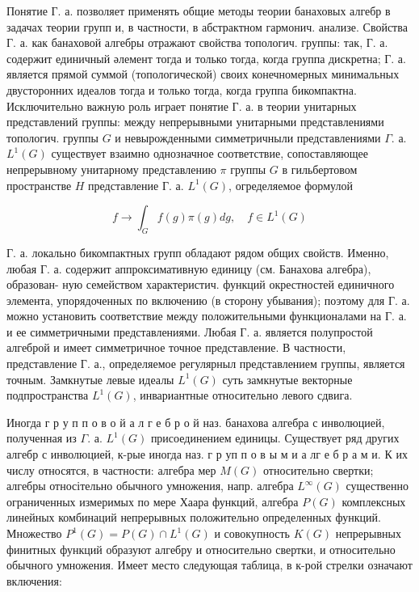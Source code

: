 \documentclass[10pt]{article}
\begin{document}
Понятие Г. а. позволяет применять общие методы теории банаховых алгебр в задачах теории групп и, в частности, в абстрактном гармонич. анализе. Свойства Г. а. как банаховой алгебры отражают свойства топологич. группы: так, Г. а. содержит единичный әлемент тогда и только тогда, когда группа дискретна; Г. а. является прямой суммой (топологической) своих конечномерных минимальных двусторонних идеалов тогда и только тогда, когда группа бикомпактна. Исключительно важную роль играет понятие Г. а. в теории унитарных представлений группы: между непрерывными унитарными представлениями топологич. группы $G$ и невырожденными симметричныли представлениями $\Gamma$. а. $L^{1}(G)$ существует взаимно однозначное соответствие, сопоставляющее непрерывному унитарному представлению $\pi$ группы $G$ в гильбертовом пространстве $H$ представление Г. а. $L^{1}(G)$, огределяемое формулой



\[

f \longrightarrow \int_{G} f(g) \pi(g) d g, \quad f \in L^{1}(G)

\]



Г. а. локально бикомпактных групп обладают рядом общих свойств. Именно, любая Г. а. содержит аппроксимативную единицу (см. Банахова алгебра), образован- ную семейством характеристич. функций окрестностей единичного элемента, упорядоченных по включению (в сторону убывания); поэтому для Г. а. можно установить соответствие между положительными функционалами на $Г$. а. и ее симметричными представлениями. Любая Г. а. является полупростой алгеброй и имеет симметричное точное представление. В частности, представление Г. а., определяемое регулярныл представлением группы, является точным. Замкнутые левые идеалы $L^{1}(G)$ суть замкнутые векторные подпространства $L^{1}(G)$, инвариантные относительно левого сдвига.



Иногда г р у п п о в о й а л г е б р о й наз. банахова алгебра с инволюцией, полученная из $\Gamma$. а. $L^{1}(G)$ присоединением единицы. Существует ряд других алгебр с инволюцией, к-рые иногда наз. г р уп п о в ы м и а лг е б р а м и. К их числу относятся, в частности: алгебра мер $M(G)$ относительно свертки; алгебры относітельно обычного умножения, напр. алгебра $L^{\infty}(G)$ существенно ограниченных измеримых по мере Хаара функций, алгебра $P(G)$ комплексных линейных комбинаций непрерывных положительно определенных функций. Множество $P^{1}(G)=P(G) \cap L^{1}(G)$ и совокупность $K(G)$ непрерывных финитных функций образуют алгебру и относительно свертки, и относительно обычного умножения. Имеет место следующая таблица, в к-рой стрелки означают включения:
\end{document}
